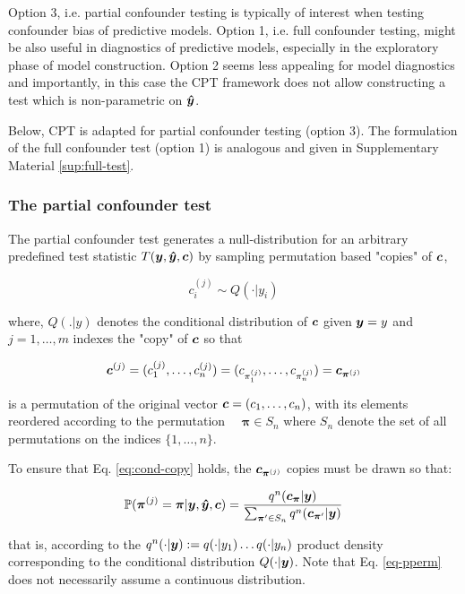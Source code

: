\documentclass{article}
\begin{document}
Option 3, i.e. partial confounder testing is typically of interest when testing confounder bias of predictive models. Option 1, i.e. full confounder testing, might be also useful in diagnostics of predictive models, especially in the exploratory phase of model construction. Option 2 seems less appealing for model diagnostics and importantly, in this case the CPT framework does not allow constructing a test which is non-parametric on $\boldsymbol{\hat{y}}$.

Below, CPT is adapted for partial confounder testing (option 3). The formulation of the full confounder test (option 1) is analogous and given in Supplementary Material \ref{sup:full-test}.
\subsubsection*{The partial confounder test}

The partial confounder test generates a null-distribution for an arbitrary predefined test statistic $T(\boldsymbol{y},\boldsymbol{\hat{y}},\boldsymbol{c})$ by sampling permutation based "copies" of $\boldsymbol{c}$,

\begin{equation}
    c_i^{(j)} \sim Q(\cdot|y_i)
     \label{eq:cond-copy}
\end{equation}

where, $Q(.|y)$ denotes the conditional distribution of $\boldsymbol{c}$ given $\boldsymbol{y}=y$ and $j=1,\dots, m$ indexes the "copy" of $\boldsymbol{c}$ so that

$$ \boldsymbol{c}^{(j)} = (c_1^{(j)}, \dots, c_n^{(j)}) = (c_{\pi_1^{(j)}}, \dots, c_{\pi_n^{(j)}}) =  \boldsymbol{c}_{\boldsymbol{\pi}^{(j)}} $$

is a permutation of the original vector $\boldsymbol{c} = (c_1, \dots, c_n)$, with its elements reordered according to the permutation $\quad \boldsymbol{\pi} \in S_n$ where $S_n$ denote the set of all permutations on the indices $\{1,\dots,n\}$.

To ensure that Eq. \ref{eq:cond-copy} holds, the $\boldsymbol{c}_{\boldsymbol{\pi}^{(j)}}$ copies must be drawn so that:

\begin{equation}
    \label{eq-pperm}
    \mathbb{P}(\boldsymbol{ \pi }^{(j)} = \boldsymbol{ \pi } | \boldsymbol{y},\boldsymbol{\hat{y}},\boldsymbol{c}) = \frac{q^n(\boldsymbol{c}_{\boldsymbol{ \pi }} | \boldsymbol{y})}{\sum_{\boldsymbol{ \pi } ' \in S_n} q^n(\boldsymbol{c}_{\boldsymbol{ \pi } ' } | \boldsymbol{y})}
\end{equation}


that is, according to the $q^n(\cdot|\boldsymbol{y}) := q(\cdot | y_1) \dots q(\cdot|y_n)$ product density corresponding to the conditional distribution $Q(\cdot|\boldsymbol{y})$. Note that Eq. \ref{eq-pperm} does not necessarily assume a continuous distribution.
\end{document}
